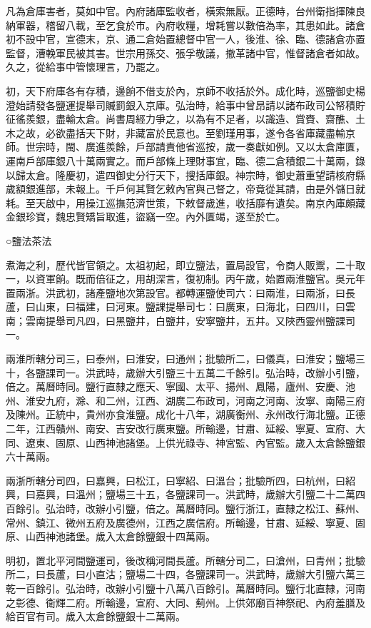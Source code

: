 凡為倉庫害者，莫如中官。內府諸庫監收者，橫索無厭。正德時，台州衛指揮陳良納軍器，稽留八載，至乞食於市。內府收糧，增耗嘗以數倍為率，其患如此。諸倉初不設中官，宣德末，京、通二倉始置總督中官一人，後淮、徐、臨、德諸倉亦置監督，漕輓軍民被其害。世宗用孫交、張孚敬議，撤革諸中官，惟督諸倉者如故。久之，從給事中管懷理言，乃罷之。

初，天下府庫各有存積，邊餉不借支於內，京師不收括於外。成化時，巡鹽御史楊澄始請發各鹽運提舉司贓罰銀入京庫。弘治時，給事中曾昂請以諸布政司公帑積貯征徭羨銀，盡輸太倉。尚書周經力爭之，以為有不足者，以識造、賞賚、齋醮、土木之故，必欲盡括天下財，非藏富於民意也。至劉瑾用事，遂令各省庫藏盡輸京師。世宗時，閩、廣進羨餘，戶部請責他省巡按，歲一奏獻如例。又以太倉庫匱，運南戶部庫銀八十萬兩實之。而戶部條上理財事宜，臨、德二倉積銀二十萬兩，錄以歸太倉。隆慶初，遣四御史分行天下，搜括庫銀。神宗時，御史蕭重望請核府縣歲額銀進部，未報上。千戶何其賢乞敕內官與己督之，帝竟從其請，由是外儲日就耗。至天啟中，用操江巡撫范濟世策，下敕督歲進，收括靡有遺矣。南京內庫頗藏金銀珍寶，魏忠賢矯旨取進，盜竊一空。內外匱竭，遂至於亡。

○鹽法茶法

煮海之利，歷代皆官領之。太祖初起，即立鹽法，置局設官，令商人販鬻，二十取一，以資軍餉。既而倍征之，用胡深言，復初制。丙午歲，始置兩淮鹽官。吳元年置兩浙。洪武初，諸產鹽地次第設官。都轉運鹽使司六：曰兩淮，曰兩浙，曰長蘆，曰山東，曰福建，曰河東。鹽課提舉司七：曰廣東，曰海北，曰四川，曰雲南；雲南提舉司凡四，曰黑鹽井，白鹽井，安寧鹽井，五井。又陜西靈州鹽課司一。

兩淮所轄分司三，曰泰州，曰淮安，曰通州；批驗所二，曰儀真，曰淮安；鹽場三十，各鹽課司一。洪武時，歲辦大引鹽三十五萬二千餘引。弘治時，改辦小引鹽，倍之。萬曆時同。鹽行直隸之應天、寧國、太平、揚州、鳳陽，廬州、安慶、池州、淮安九府，滁、和二州，江西、湖廣二布政司，河南之河南、汝寧、南陽三府及陳州。正統中，貴州亦食淮鹽。成化十八年，湖廣衡州、永州改行海北鹽。正德二年，江西贛州、南安、吉安改行廣東鹽。所輸邊，甘肅、延綏、寧夏、宣府、大同、遼東、固原、山西神池諸堡。上供光祿寺、神宮監、內官監。歲入太倉餘鹽銀六十萬兩。

兩浙所轄分司四，曰嘉興，曰松江，曰寧紹、曰溫台；批驗所四，曰杭州，曰紹興，曰嘉興，曰溫州；鹽場三十五，各鹽課司一。洪武時，歲辦大引鹽二十二萬四百餘引。弘治時，改辦小引鹽，倍之。萬曆時同。鹽行浙江，直隸之松江、蘇州、常州、鎮江、微州五府及廣德州，江西之廣信府。所輸邊，甘肅、延綏、寧夏、固原、山西神池諸堡。歲入太倉餘鹽銀十四萬兩。

明初，置北平河間鹽運司，後改稱河間長蘆。所轄分司二，曰滄州，曰青州；批驗所二，曰長蘆，曰小直沽；鹽場二十四，各鹽課司一。洪武時，歲辦大引鹽六萬三乾一百餘引。弘治時，改辦小引鹽十八萬八百餘引。萬曆時同。鹽行北直隸，河南之彰德、衛輝二府。所輸邊，宣府、大同、薊州。上供郊廟百神祭祀、內府羞膳及給百官有司。歲入太倉餘鹽銀十二萬兩。

